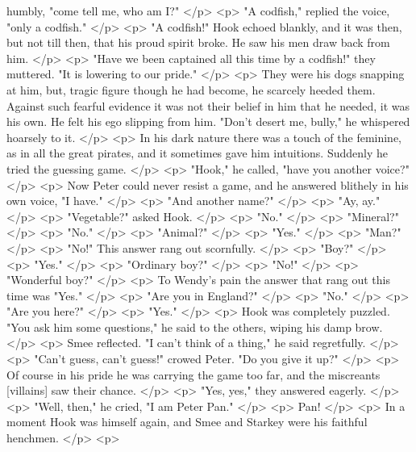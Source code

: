       humbly, "come tell me, who am I?"
    </p>
    <p>
      "A codfish," replied the voice, "only a codfish."
    </p>
    <p>
      "A codfish!" Hook echoed blankly, and it was then, but not till then, that
      his proud spirit broke. He saw his men draw back from him.
    </p>
    <p>
      "Have we been captained all this time by a codfish!" they muttered. "It is
      lowering to our pride."
    </p>
    <p>
      They were his dogs snapping at him, but, tragic figure though he had
      become, he scarcely heeded them. Against such fearful evidence it was not
      their belief in him that he needed, it was his own. He felt his ego
      slipping from him. "Don't desert me, bully," he whispered hoarsely to it.
    </p>
    <p>
      In his dark nature there was a touch of the feminine, as in all the great
      pirates, and it sometimes gave him intuitions. Suddenly he tried the
      guessing game.
    </p>
    <p>
      "Hook," he called, "have you another voice?"
    </p>
    <p>
      Now Peter could never resist a game, and he answered blithely in his own
      voice, "I have."
    </p>
    <p>
      "And another name?"
    </p>
    <p>
      "Ay, ay."
    </p>
    <p>
      "Vegetable?" asked Hook.
    </p>
    <p>
      "No."
    </p>
    <p>
      "Mineral?"
    </p>
    <p>
      "No."
    </p>
    <p>
      "Animal?"
    </p>
    <p>
      "Yes."
    </p>
    <p>
      "Man?"
    </p>
    <p>
      "No!" This answer rang out scornfully.
    </p>
    <p>
      "Boy?"
    </p>
    <p>
      "Yes."
    </p>
    <p>
      "Ordinary boy?"
    </p>
    <p>
      "No!"
    </p>
    <p>
      "Wonderful boy?"
    </p>
    <p>
      To Wendy's pain the answer that rang out this time was "Yes."
    </p>
    <p>
      "Are you in England?"
    </p>
    <p>
      "No."
    </p>
    <p>
      "Are you here?"
    </p>
    <p>
      "Yes."
    </p>
    <p>
      Hook was completely puzzled. "You ask him some questions," he said to the
      others, wiping his damp brow.
    </p>
    <p>
      Smee reflected. "I can't think of a thing," he said regretfully.
    </p>
    <p>
      "Can't guess, can't guess!" crowed Peter. "Do you give it up?"
    </p>
    <p>
      Of course in his pride he was carrying the game too far, and the
      miscreants [villains] saw their chance.
    </p>
    <p>
      "Yes, yes," they answered eagerly.
    </p>
    <p>
      "Well, then," he cried, "I am Peter Pan."
    </p>
    <p>
      Pan!
    </p>
    <p>
      In a moment Hook was himself again, and Smee and Starkey were his faithful
      henchmen.
    </p>
    <p>
